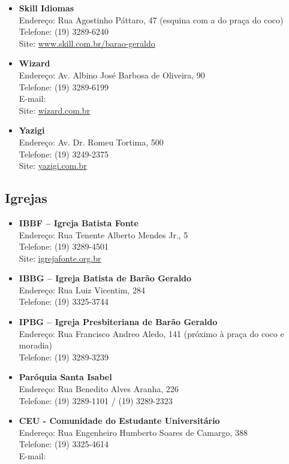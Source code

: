 \begin{itemize}
\item \textbf{Skill Idiomas}
  \\Endereço: Rua Agostinho Páttaro, 47 (esquina com a do praça do coco)
  \\Telefone: (19) 3289-6240
  \\Site: \url{www.skill.com.br/barao-geraldo}

\item \textbf{Wizard}
  \\Endereço: Av. Albino José Barbosa de Oliveira, 90
  \\Telefone: (19) 3289-6199
  \\E-mail: 
  \\Site: \url{wizard.com.br}

\item \textbf{Yazigi}
  \\Endereço: Av. Dr. Romeu Tortima, 500
  \\Telefone: (19) 3249-2375
  \\Site: \url{yazigi.com.br}
\end{itemize}

\subsection{Igrejas}

\begin{itemize}
\item \textbf{IBBF -- Igreja Batista Fonte}
  \\Endereço: Rua Tenente Alberto Mendes Jr., 5
  \\Telefone: (19) 3289-4501
  \\Site: \url{igrejafonte.org.br}

\item \textbf{IBBG -- Igreja Batista de Barão Geraldo}
  \\Endereço: Rua Luiz Vicentim, 284
  \\Telefone: (19) 3325-3744

\item \textbf{IPBG -- Igreja Presbiteriana de Barão Geraldo}
  \\Endereço: Rua Francisco Andreo Aledo, 141 (próximo à praça do coco e
  moradia)
  \\Telefone: (19) 3289-3239

\item \textbf{Paróquia Santa Isabel}
  \\Endereço: Rua Benedito Alves Aranha, 226
  \\Telefone: (19) 3289-1101 / (19) 3289-2323

\item \textbf{CEU - Comunidade do Estudante Universitário}
  \\Endereço: Rua Engenheiro Humberto Soares de Camargo, 388
  \\Telefone: (19) 3325-4614
  \\E-mail: 
\end{itemize}

